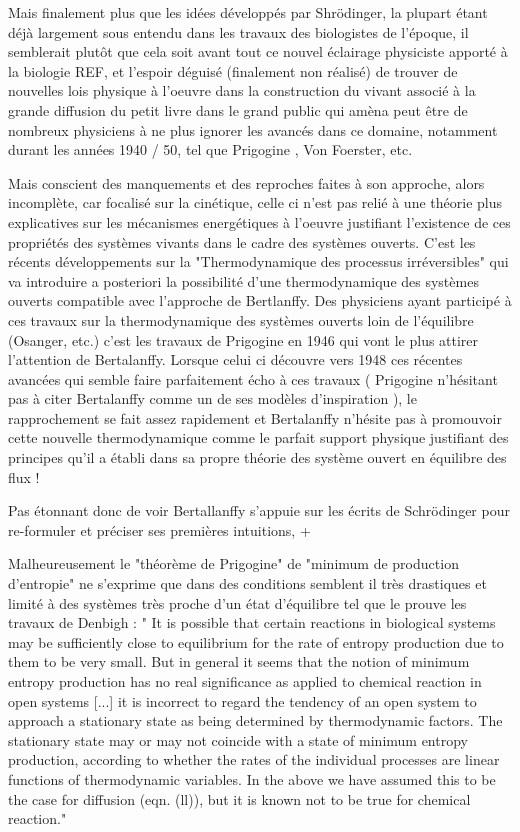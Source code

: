 {\autocite[482]{Pouvreau2013} Mais finalement plus que les idées développés par Shrödinger, la plupart étant déjà largement sous entendu dans les travaux des biologistes de l'époque, il semblerait plutôt que cela soit avant tout ce nouvel éclairage physiciste apporté à la biologie {REF}, et l'espoir déguisé (finalement non réalisé) de trouver de nouvelles lois physique à l'oeuvre dans la construction du vivant associé à la grande diffusion du petit livre dans le grand public qui amèna peut être de nombreux physiciens à ne plus ignorer les avancés dans ce domaine, notamment durant les années 1940 / 50, tel que Prigogine \autocite[77]{Prigogine1996}, Von Foerster, etc. \autocite[73]{Lemoigne1977} 

Mais conscient des manquements et des reproches faites à son approche, alors incomplète, car focalisé sur la cinétique, celle ci n'est pas relié à une théorie plus explicatives sur les mécanismes energétiques à l'oeuvre justifiant l'existence de ces propriétés des systèmes vivants dans le cadre des systèmes ouverts. C'est les récents développements sur la "Thermodynamique des processus irréversibles" qui va introduire a posteriori la possibilité d'une thermodynamique des systèmes ouverts compatible avec l'approche de Bertlanffy. Des physiciens ayant participé à ces travaux sur la thermodynamique des systèmes ouverts loin de l'équilibre (Osanger, etc.) c'est les travaux de Prigogine  en 1946 \autocite{Prigogine1946} qui vont le plus attirer l'attention de Bertalanffy. Lorsque celui ci découvre vers 1948 ces récentes avancées qui semble faire parfaitement écho à ces travaux ( Prigogine n'hésitant pas à citer Bertalanffy comme un de ses modèles d'inspiration \autocite{Prigogine1996}), le rapprochement se fait assez rapidement et Bertalanffy n'hésite pas à promouvoir cette nouvelle thermodynamique comme le parfait support physique justifiant des principes qu'il a établi dans sa propre théorie des système ouvert en équilibre des flux ! \autocite[653-658]{Pouvreau2013}

Pas étonnant donc de voir Bertallanffy s'appuie sur les écrits de Schrödinger pour re-formuler et préciser ses premières intuitions, 
+

Malheureusement le "théorème de Prigogine" de "minimum de production d'entropie" ne s'exprime que dans des conditions semblent il très drastiques \autocite[53]{Lebon2008} et limité à des systèmes très proche d'un état d'équilibre tel que le prouve les travaux de Denbigh : " It is possible that certain reactions in biological systems may be sufficiently close to equilibrium for the rate of entropy production due to them to be very small. But in general it seems that the notion of minimum entropy production has no real significance as applied to chemical reaction in open systems [...] it is incorrect to regard the tendency of an open system to approach a stationary state as being determined by thermodynamic factors. The stationary state may or may not coincide with a state of minimum entropy production, according to whether the rates of the individual processes are linear functions of thermodynamic variables. In the above we have assumed this to be the case for diffusion (eqn. (ll)), but it is known not to be true for chemical reaction." \autocite{Denbigh1952}

}
